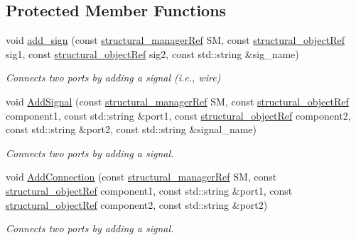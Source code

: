 \subsection*{Protected Member Functions}
\begin{DoxyCompactItemize}
\item 
void \hyperlink{classmodule__interface_ad3a3d5baf94859db72af7365110fa702}{add\+\_\+sign} (const \hyperlink{structural__manager_8hpp_ab3136f0e785d8535f8d252a7b53db5b5}{structural\+\_\+manager\+Ref} SM, const \hyperlink{structural__objects_8hpp_a8ea5f8cc50ab8f4c31e2751074ff60b2}{structural\+\_\+object\+Ref} sig1, const \hyperlink{structural__objects_8hpp_a8ea5f8cc50ab8f4c31e2751074ff60b2}{structural\+\_\+object\+Ref} sig2, const std\+::string \&sig\+\_\+name)
\begin{DoxyCompactList}\small\item\em Connects two ports by adding a signal (i.\+e., wire) \end{DoxyCompactList}\item 
void \hyperlink{classmodule__interface_a5530441acd63973aa14d4bcc27ce5a70}{Add\+Signal} (const \hyperlink{structural__manager_8hpp_ab3136f0e785d8535f8d252a7b53db5b5}{structural\+\_\+manager\+Ref} SM, const \hyperlink{structural__objects_8hpp_a8ea5f8cc50ab8f4c31e2751074ff60b2}{structural\+\_\+object\+Ref} component1, const std\+::string \&port1, const \hyperlink{structural__objects_8hpp_a8ea5f8cc50ab8f4c31e2751074ff60b2}{structural\+\_\+object\+Ref} component2, const std\+::string \&port2, const std\+::string \&signal\+\_\+name)
\begin{DoxyCompactList}\small\item\em Connects two ports by adding a signal. \end{DoxyCompactList}\item 
void \hyperlink{classmodule__interface_a2b729018fc92ed9b1b7c9453af47f8f1}{Add\+Connection} (const \hyperlink{structural__manager_8hpp_ab3136f0e785d8535f8d252a7b53db5b5}{structural\+\_\+manager\+Ref} SM, const \hyperlink{structural__objects_8hpp_a8ea5f8cc50ab8f4c31e2751074ff60b2}{structural\+\_\+object\+Ref} component1, const std\+::string \&port1, const \hyperlink{structural__objects_8hpp_a8ea5f8cc50ab8f4c31e2751074ff60b2}{structural\+\_\+object\+Ref} component2, const std\+::string \&port2)
\begin{DoxyCompactList}\small\item\em Connects two ports by adding a signal. \end{DoxyCompactList}\item 

\end{DoxyCompactItemize}

